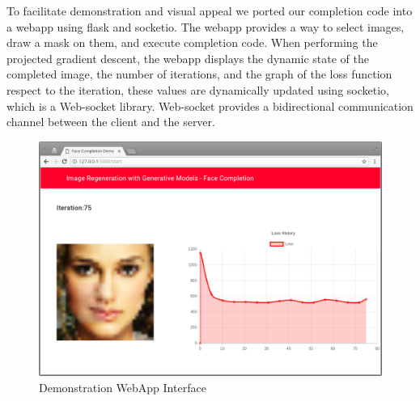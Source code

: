 \newpage
To facilitate demonstration and visual appeal we ported our completion code into a webapp using flask and socketio. The webapp provides a way to select images, draw a mask on them, and execute completion code. When performing the projected gradient descent, the webapp displays the dynamic state of the completed image, the number of iterations, and the graph of the loss function respect to the iteration, these values are dynamically updated using socketio, which is a Web-socket library. Web-socket provides a bidirectional communication channel between the client and the server. \par\bigskip
\begin{figure}[H]
\centering\includegraphics[width=1\textwidth]{images/DemoFrontend.png}
\caption{Demonstration WebApp Interface}
\label{fig:demo}
\end{figure}